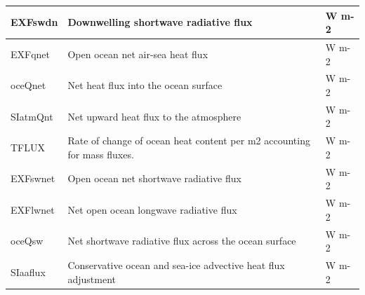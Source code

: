 \begin{longtable}{|m{}|m{}|m{}|}
EXFswdn &Downwelling shortwave radiative flux &W m-2  \\ \hline
EXFqnet &Open ocean net air-sea heat flux &W m-2  \\ \hline
oceQnet &Net heat flux into the ocean surface &W m-2  \\ \hline
SIatmQnt &Net upward heat flux to the atmosphere &W m-2  \\ \hline
TFLUX &Rate of change of ocean heat content per m2 accounting for mass fluxes. &W m-2  \\ \hline
EXFswnet &Open ocean net shortwave radiative flux &W m-2  \\ \hline
EXFlwnet &Net open ocean longwave radiative flux &W m-2  \\ \hline
oceQsw &Net shortwave radiative flux across the ocean surface &W m-2  \\ \hline
SIaaflux &Conservative ocean and sea-ice advective heat flux adjustment &W m-2  \\ \hline
\end{longtable}

\newp
\pagebreak

